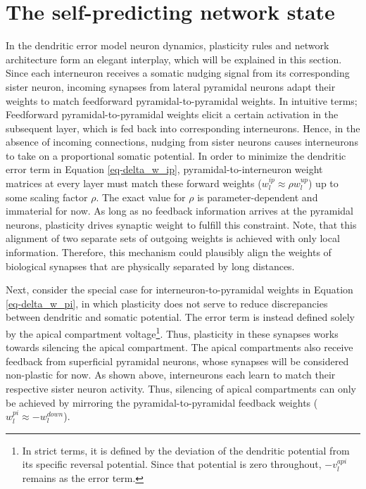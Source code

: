 \section{The self-predicting network state}\label{sec-selfpred}

In the dendritic error model neuron dynamics, plasticity rules and network architecture form an elegant interplay, which
will be explained in this section. Since each interneuron receives a somatic nudging signal from its corresponding
sister neuron, incoming synapses from lateral pyramidal neurons adapt their weights to match feedforward
pyramidal-to-pyramidal weights. In intuitive terms; Feedforward pyramidal-to-pyramidal weights elicit a certain
activation in the subsequent layer, which is fed back into corresponding interneurons. Hence, in the absence of incoming
connections, nudging from sister neurons causes interneurons to take on a proportional somatic potential. In order to
minimize the dendritic error term in Equation \ref{eq-delta_w_ip}, pyramidal-to-interneuron weight matrices at every
layer must match these forward weights ($w_l^{ip} \approx \rho w_l^{up}$) up to some scaling factor $\rho$. The exact
value for $\rho$ is parameter-dependent and immaterial for now. As long as no feedback information arrives at the
pyramidal neurons, plasticity drives synaptic weight to fulfill this constraint. Note, that this alignment of two
separate sets of outgoing weights is achieved with only local information. Therefore, this mechanism could plausibly
align the weights of biological synapses that are physically separated by long distances. \newline

Next, consider the special case for interneuron-to-pyramidal weights in Equation \ref{eq-delta_w_pi}, in which
plasticity does not serve to reduce discrepancies between dendritic and somatic potential. The error term is instead
defined solely by the apical compartment voltage\footnote{In strict terms, it is defined by the deviation of the
dendritic potential from its specific reversal potential. Since that potential is zero throughout, $- v_l^{api}$ remains
as the error term.}. Thus, plasticity in these synapses works towards silencing the apical compartment. The apical
compartments also receive feedback from superficial pyramidal neurons, whose synapses will be considered non-plastic for
now. As shown above, interneurons each learn to match their respective sister neuron activity. Thus, silencing of apical
compartments can only be achieved by mirroring the pyramidal-to-pyramidal feedback weights ($w_l^{pi} \approx
  -w_l^{down}$).\newline

